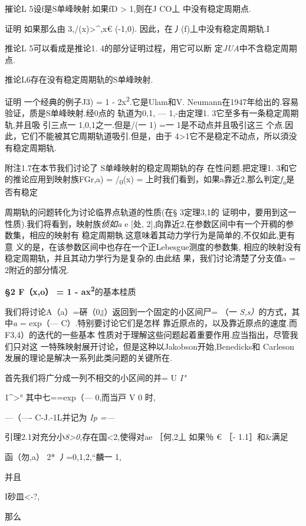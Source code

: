 \documentclass{article}
\begin{document}
摧论L 5设f是S单峰映射.如果fD \textgreater{} 1,则在J CO丄
中没有稳定周期点.

证明 如果那么由 3,/(x)\textgreater{}\^{},x€ (-1,0).
因此，在丿(f)丄中没有稳定周期轨.I

推论L 5可以看成是推论1. 4的部分证明过程，用它可以断
定\emph{JUA}中不含稳定周期点.

推论L6存在没有稳定周期轨的S单峰映射.

证明 一个经典的例子J3) = 1 - 2x\textsuperscript{2}.它是Ulam和V.
Neumann在1947年给出的.容易验证，质是S单峰映射.经0点的 轨道为0,1, ---
1,-由定理1. 3它至多有一条稳定周期轨,并且吸 引三点一 1,0,1之一.但是/(一
1) =一 1是不动点并且吸引这三
个点.因此，它们不能被其它周期轨道吸引.但是，由于
4\textgreater{}1它不是稳定不动点，所以須没有稳定周期轨.\textbar{}

附注1.7在本节我们讨论了 S单峰映射的稳定周期轨的存 在性问题.把定理1.
3和它的推论应用到映射族FGr,a) = /\textsubscript{0}(x) =
上时我们看到，如果a靠近2,那么判定\emph{f\textsubscript{a}}是否有稳定

周期轨的问题转化为讨论临界点轨道的性质(在§ 3定理3,1的
证明中，要用到这一性质).我们将看到，映射族\emph{侦如a} e {[}处,
2{]},向靠近2,在参数区间中有一个开稠的参数集，相应的映射有
稳定周期執.这意味着其动力学行为是简单的,不仅如此,更有意
义的是，在该参数区间中也存在一个正Lebesgue测度的参数集,
相应的映射没有稳定周期轨，并且其动力学行为是复杂的.由此结
果，我们讨论清楚了分支值a = 2附近的部分情况.

\textbf{§2 F（x,o） = 1 - ax\textsuperscript{2}}的基本桂质

我们将讨论A（a）=硏（0』）返回到一个固定的小区间尸= （一
\emph{S,s）}的方式，其中\emph{a} = exp（--- C）.特别要讨论它们是怎样
靠近原点的，以及靠近原点的速度.而F3,4）的迭代的一些基本
性质对于理解这些问题起着重要作用.应当指出，尽管我们只对这
一特殊映射展开讨论，但是这种以Jakobson开始,Benedicks和
Carleson发展的理论是解决一系列此类问题的关键所在.

首先我们将广分成一列不相交的小区间的并= U \emph{I"}

1\^{}\textbar{}\textgreater{}° 其中七==exp（--- 0,而当戸 V 0 时,

---（---- C-J.-1L并记为 \emph{Ip =---}

引理2.1对充分小\emph{8\textgreater{}0,}存在国\textless{}2,使得对ae
［何,2丄 如果％ € ［- 1.1］和\&满足

函（勿,a）\textbar{} 2* 丿=0,1,2,``麟一 1,

并且

I砂皿\textless{}-?,

那么
\end{document}
